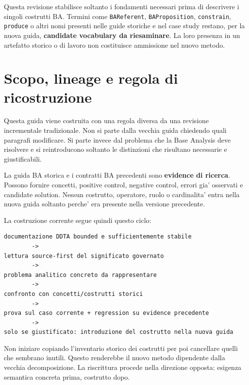 \documentclass[11pt,a4paper]{article}
\begin{document}
\begin{titlepage}
\vfill
\begin{ddtaopen}[title={Boundary della revisione corrente}]
Questa revisione stabilisce soltanto i fondamenti necessari prima di descrivere i singoli costrutti BA. Termini come \texttt{BAReferent}, \texttt{BAProposition}, \texttt{constrain}, \texttt{produce} o altri nomi presenti nelle guide storiche e nel case study restano, per la nuova guida, \textbf{candidate vocabulary da riesaminare}. La loro presenza in un artefatto storico o di lavoro non costituisce ammissione nel nuovo metodo.
\end{ddtaopen}
\end{titlepage}

\tableofcontents
\clearpage

\section{Scopo, lineage e regola di ricostruzione}

Questa guida viene costruita con una regola diversa da una revisione incrementale tradizionale. Non si parte dalla vecchia guida chiedendo quali paragrafi modificare. Si parte invece dal problema che la Base Analysis deve risolvere e si reintroducono soltanto le distinzioni che risultano necessarie e giustificabili.

\begin{ddtacore}[title={Regola di lineage}]
La guida BA storica e i contratti BA precedenti sono \textbf{evidence di ricerca}. Possono fornire concetti, positive control, negative control, errori gia' osservati e candidate solution. Nessun costrutto, operatore, ruolo o cardinalita' entra nella nuova guida soltanto perche' era presente nella versione precedente.
\end{ddtacore}

La costruzione corrente segue quindi questo ciclo:

\begin{lstlisting}
documentazione DDTA bounded e sufficientemente stabile
        ->
lettura source-first del significato governato
        ->
problema analitico concreto da rappresentare
        ->
confronto con concetti/costrutti storici
        ->
prova sul caso corrente + regression su evidence precedente
        ->
solo se giustificato: introduzione del costrutto nella nuova guida
\end{lstlisting}

\begin{ddtaanti}[title={Non fare una copia selettiva della vecchia guida}]
Non iniziare copiando l'inventario storico dei costrutti per poi cancellare quelli che sembrano inutili. Questo renderebbe il nuovo metodo dipendente dalla vecchia decomposizione. La riscrittura procede nella direzione opposta: esigenza semantica concreta prima, costrutto dopo.
\end{ddtaanti}
\end{document}
